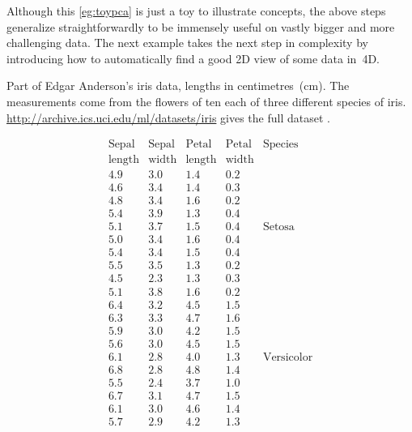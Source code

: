 \begin{example}
\begin{solution}
\begin{enumerate}
\begin{figbox}
\end{figbox}
\end{enumerate}
\end{solution}
\end{example}

Although this \cref{eg:toypca} is just a toy to illustrate concepts, the above steps generalize straightforwardly to be immensely useful on vastly bigger and more challenging data.
The next example takes the next step in complexity by introducing how to automatically find a good 2D view of some data in~4D.





\begin{example} \label{eg:eaid}
\begin{table}
\caption{Part of Edgar Anderson's iris data, lengths in centimetres~(cm).  
The measurements come from the flowers of ten each of three different species of iris.
\protect\url{http://archive.ics.uci.edu/ml/datasets/iris} gives the full dataset \cite[]{Dua2019}.
}
\label{tbl:eaid}
\begin{equation*}
\begin{array}{rrrrl}
\hline
\text{Sepal}&\text{Sepal}&\text{Petal}&\text{Petal}&\text{Species}
\\\text{length}&\text{width}&\text{length}&\text{width}&
\\\hline
  4.9&3.0&1.4&0.2&
\\4.6&3.4&1.4&0.3&
\\4.8&3.4&1.6&0.2&
\\5.4&3.9&1.3&0.4&
\\5.1&3.7&1.5&0.4&\text{Setosa}
\\5.0&3.4&1.6&0.4&
\\5.4&3.4&1.5&0.4&
\\5.5&3.5&1.3&0.2&
\\4.5&2.3&1.3&0.3&
\\5.1&3.8&1.6&0.2&
\\\hline
  6.4&3.2&4.5&1.5&
\\6.3&3.3&4.7&1.6&
\\5.9&3.0&4.2&1.5&
\\5.6&3.0&4.5&1.5&
\\6.1&2.8&4.0&1.3&\text{Versicolor}
\\6.8&2.8&4.8&1.4&
\\5.5&2.4&3.7&1.0&
\\6.7&3.1&4.7&1.5&
\\6.1&3.0&4.6&1.4&
\\5.7&2.9&4.2&1.3&

\end{array}
\end{equation*}
\end{table}
\end{example}
